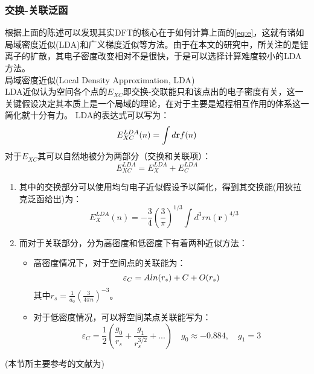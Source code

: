 \subsubsection*{交换-关联泛函}
根据上面的陈述可以发现其实DFT的核心在于如何计算上面的\ref{eq:e}，这就有诸如局域密度近似(LDA)和广义梯度近似等方法。由于在本文的研究中，所关注的是锂离子的扩散，其电子密度改变相对不是很快，于是可以选择计算难度较小的LDA方法。\\
局域密度近似(Local Density Approximation, LDA)\\
\indent LDA近似认为空间各个点的$E_{XC}$即交换-交联能只和该点出的电子密度有关，这一关键假设决定其本质上是一个局域的理论，在对于主要是短程相互作用的体系这一简化就十分有力。 LDA的表达式可以写为：
\begin{equation}
E^{LDA}_{XC}(n) = \int d \mathbf{r} \mathnormal{f}(n)
\end{equation}
对于$E_{XC}$其可以自然地被分为两部分（交换和关联项）：
\begin{equation}
E^{LDA}_{XC} = E^{LDA}_X + E^{LDA}_C
\end{equation}
\begin{enumerate}
	\item 其中的交换部分可以使用均匀电子近似假设予以简化，得到其交换能(用狄拉克泛函给出)为：
	\begin{equation}
	E^{LDA}_X(n) = -\frac{3}{4} \left(\frac{3}{\pi} \right)^{1/3} \int d^3r n(\mathbf{r})^{4/3}
	\end{equation}
	\item 而对于关联部分，分为高密度和低密度下有着两种近似方法：
	\begin{itemize}
		\item 高密度情况下，对于空间点的关联能为：
		\begin{equation}
		\varepsilon_C = Aln(r_s) + C + \mathnormal{O}(r_s)
		\end{equation}
		其中$r_s = \frac{1}{a_0} \left(\frac{3}{4\pi n} \right)^{-3}$。
		\item 对于低密度情况，可以将空间某点关联能写为：
		\begin{equation}
		\varepsilon_C = \frac{1}{2} \left(\frac{g_0}{r_s} + \frac{g_1}{r^{3/2}_s} + ... \right) \quad g_0 \approx -0.884,\quad g_1=3
		\end{equation}
	\end{itemize}
\end{enumerate}
(本节所主要参考的文献为\cite{Parr1989Density,Burke2005Time,Becke1993Density})
